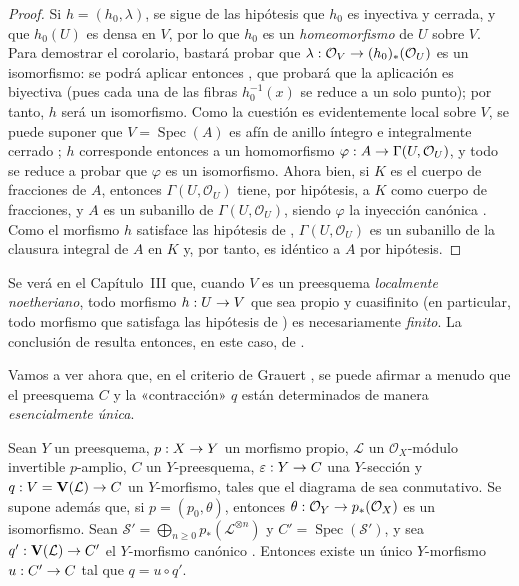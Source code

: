 \documentclass[oneside,10pt]{amsart}
\makeatletter
\newcommand{\ega@arrow}[2]{\mathchoice{#1}{#2}{#2}{#2}}
\renewcommand{\to}{\ega@arrow{\longrightarrow}{\rightarrow}}
\newcommand{\oldpage}[2][]{\marginnote{\normalfont\footnotesize\textbf{#1}~|~#2}\ignorespaces}
\let\EGAOriginalLabel\label
\renewcommand{\label}[1]{\phantomsection\EGAOriginalLabel{#1}}
\makeatother
\begin{document}
\begin{proof}
Si $h=(h_0,\lambda)$, se sigue de las hipótesis que $h_0$ es inyectiva y cerrada, y que $h_0(U)$
\oldpage[II]{190}
es densa en $V$, por lo que $h_0$ es un \emph{homeomorfismo} de $U$ sobre $V$.
Para demostrar el corolario, bastará probar que $\lambda:\mathcal{O}_V\to(h_0)_*(\mathcal{O}_U)$ es un isomorfismo: se podrá aplicar entonces , que probará que la aplicación  es biyectiva (pues cada una de las fibras $h_0^{-1}(x)$ se reduce a un solo punto);
por tanto, $h$ será un isomorfismo.
Como la cuestión es evidentemente local sobre $V$, se puede suponer que $V=\operatorname{Spec}(A)$ es afín de anillo íntegro e integralmente cerrado ;
$h$ corresponde entonces  a un homomorfismo $\varphi:A\to\Gamma(U,\mathcal{O}_U)$, y todo se reduce a probar que $\varphi$ es un isomorfismo.
Ahora bien, si $K$ es el cuerpo de fracciones de $A$, entonces $\Gamma(U,\mathcal{O}_U)$ tiene, por hipótesis, a $K$ como cuerpo de fracciones, y $A$ es un subanillo de $\Gamma(U,\mathcal{O}_U)$, siendo $\varphi$ la inyección canónica .
Como el morfismo $h$ satisface las hipótesis de , $\Gamma(U,\mathcal{O}_U)$ es un subanillo de la clausura integral de $A$ en $K$ y, por tanto, es idéntico a $A$ por hipótesis.
\end{proof}

\begin{remark}[8.11.3]
\label{II.8.11.3-fr}
Se verá en el Capítulo~III  que, cuando $V$ es un preesquema \emph{localmente noetheriano}, todo morfismo $h:U\to V$ que sea propio y cuasifinito (en particular, todo morfismo que satisfaga las hipótesis de ) es necesariamente \emph{finito}.
La conclusión de  resulta entonces, en este caso, de .
\end{remark}

\begin{env}[8.11.4]
\label{II.8.11.4-fr}
Vamos a ver ahora que, en el criterio de Grauert , se puede afirmar a menudo que el preesquema $C$ y la «contracción» $q$ están determinados de manera \emph{esencialmente única}.
\end{env}

\begin{lemma}[8.11.5]
\label{II.8.11.5-fr}
Sean $Y$ un preesquema, $p:X\to Y$ un morfismo propio, $\mathcal{L}$ un $\mathcal{O}_X$-módulo invertible $p$-amplio, $C$ un $Y$-preesquema, $\varepsilon:Y\to C$ una $Y$-sección y $q:V=\mathbf{V}(\mathcal{L})\to C$ un $Y$-morfismo, tales que el diagrama de  sea conmutativo.
Se supone además que, si $p=(p_0,\theta)$, entonces $\theta:\mathcal{O}_Y\to p_*(\mathcal{O}_X)$ es un isomorfismo.
Sean $\mathcal{S}'=\bigoplus_{n\geqslant0}p_*(\mathcal{L}^{\otimes n})$ y $C'=\operatorname{Spec}(\mathcal{S}')$, y sea $q':\mathbf{V}(\mathcal{L})\to C'$ el $Y$-morfismo canónico .
Entonces existe un único $Y$-morfismo $u:C'\to C$ tal que $q=u\circ q'$.
\end{lemma}
\end{document}
